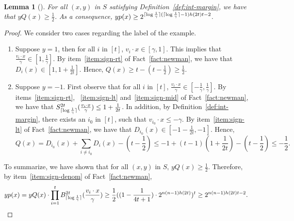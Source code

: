 \documentclass{article}
\DeclarePairedDelimiter\ceil{\lceil}{\rceil}
\newtheorem{lemma}[theorem]{Lemma}
\begin{document}
\begin{lemma}[\cite{klivans2004learning}]
For all $(x,y)$ in $S$ satisfying Definition~\ref{def:int-margin}, we have that $y Q(x) \geq \frac 1 2$.
As a consequence, $y p(x) \geq 2^{\ceil{\log \frac 1 \gamma}(\ceil{\log \frac 1 \gamma}-1)h(2t)t - 2}$.
\label{lem:rational-margin}
\end{lemma}
\begin{proof}
We consider two cases regarding the label of the example.
\begin{enumerate}
\item Suppose $y = 1$, then for all $i$ in $[t]$, $v_i \cdot x \in [\gamma, 1]$. This implies that $\frac{v_i \cdot x}{\gamma} \in [1, \frac 1 \gamma]$.
By item~\ref{item:sign-rt} of Fact~\ref{fact:newman}, we have that $D_i(x) \in [1, 1+ \frac 1 {2t}]$.
Hence, $Q(x) \geq t - (t - \frac 1 2) \geq \frac 1 2$.

\item Suppose $y = -1$. First observe that for all $i$ in $[t]$, $\frac{v_i \cdot x}{\gamma} \in [-\frac 1\gamma, \frac 1 \gamma]$. By items~\ref{item:sign-rt},
~\ref{item:sign-lt} and~\ref{item:sign-mid} of Fact~\ref{fact:newman}, we have that $S_{\ceil{\log \frac 1 \gamma}}^{2t}(\frac{v_i \cdot x}{\gamma}) \leq 1+ \frac 1 {2t}$.
In addition, by Definition~\ref{def:int-margin}, there exists an $i_0$ in $[t]$, such that $v_{i_0} \cdot x \leq -\gamma$.
By item~\ref{item:sign-lt} of Fact~\ref{fact:newman}, we have that
$D_{i_0}(x) \in [-1 - \frac 1 {2t}, -1]$.
Hence,
\[ Q(x) = D_{i_0}(x) + \sum_{i \neq i_0} D_i(x) - (t - \frac 1 2)
\leq -1 + (t-1)(1 + \frac 1 {2t}) - (t - \frac 1 2) \leq - \frac 1 2. \]
\end{enumerate}
To summarize, we have shown that for all $(x,y)$ in $S$, $y Q(x) \geq \frac 1 2$.
Therefore, by item~\ref{item:sign-denom} of Fact~\ref{fact:newman},
\[ y p(x) = y Q(x) \cdot \prod_{i=1}^t B_{\ceil{\log \frac 1 \gamma}}^{2t}(\frac{v_i \cdot x}\gamma) \geq \frac 1 2 ((1-\frac{1}{4t+1}) \cdot 2^{n(n-1)h(2t)})^t \geq 2^{n(n-1)h(2t)t - 2}. \]
\end{proof}
\end{document}
